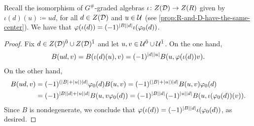 \begin{prop}\label{prop:R-and-D-have-the-same-center}
	Recall the isomorphism of $G^\#$-graded algebras $\iota\colon Z(\mathcal{D}) \to Z(R)$ given by $\iota (d)(u) \coloneqq ud$, for all $d\in Z(\mathcal{D})$ and $u\in \mathcal U$ (see \cref{prop:R-and-D-have-the-same-center}). 
	We have that $\varphi (\iota (d)) = (-1)^{|B||d|} \iota (\varphi_0(d))$. 
\end{prop}

\begin{proof}
	Fix $d\in Z(\mathcal{D})^{\bar0} \cup Z(\mathcal{D})^{\bar1}$ and let $u, v \in \mathcal U^{\bar0} \cup \mathcal U^{\bar1}$.
	On the one hand,
	\begin{align*}
		B(ud,v) = B(\iota (d)(u), v) = (-1)^{|d||u|} B(u, \varphi(\iota (d)) v).
	\end{align*}
	On the other hand,
	\begin{align*}
		B(ud, v) &= (-1)^{(|B| + |u|) |d|} \varphi_0(d) B(u, v) = (-1)^{(|B| + |u|) |d|} B(u, v) \varphi_0(d)     \\
		 & = (-1)^{|B||d| + |u||d|} B(u, v \varphi_0(d) ) 
		 = (-1)^{|B||d|} (-1)^{|u||d|} B(u, \iota (\varphi_0(d))(v)). 
	\end{align*}
	Since $B$ is nondegenerate, we conclude that $\varphi (\iota (d)) = (-1)^{|B||d|} \iota (\varphi_0(d))$, as desired. 
\end{proof}
